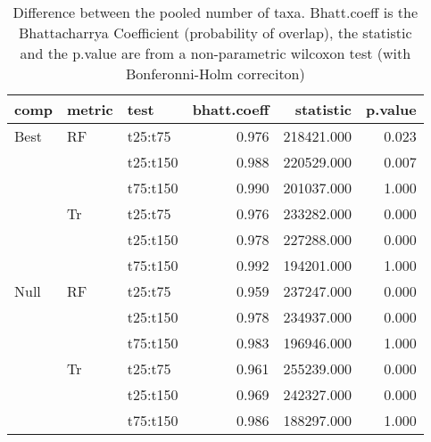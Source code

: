 \begin{table}[ht]
\centering
\begin{tabular}{lllrrr}
  \hline
comp & metric & test & bhatt.coeff & statistic & p.value \\ 
  \hline
Best & RF & t25:t75 & 0.976 & 218421.000 & 0.023 \\ 
   &  & t25:t150 & 0.988 & 220529.000 & 0.007 \\ 
   &  & t75:t150 & 0.990 & 201037.000 & 1.000 \\ 
   & Tr & t25:t75 & 0.976 & 233282.000 & 0.000 \\ 
   &  & t25:t150 & 0.978 & 227288.000 & 0.000 \\ 
   &  & t75:t150 & 0.992 & 194201.000 & 1.000 \\ 
  Null & RF & t25:t75 & 0.959 & 237247.000 & 0.000 \\ 
   &  & t25:t150 & 0.978 & 234937.000 & 0.000 \\ 
   &  & t75:t150 & 0.983 & 196946.000 & 1.000 \\ 
   & Tr & t25:t75 & 0.961 & 255239.000 & 0.000 \\ 
   &  & t25:t150 & 0.969 & 242327.000 & 0.000 \\ 
   &  & t75:t150 & 0.986 & 188297.000 & 1.000 \\ 
   \hline
\end{tabular}
\caption{Difference between the pooled number of taxa. Bhatt.coeff is the Bhattacharrya Coefficient (probability of overlap), the statistic and the p.value are from a non-parametric wilcoxon test (with Bonferonni-Holm correciton)} 
\label{Full_Tab_pooledstaxa_test}
\end{table}
